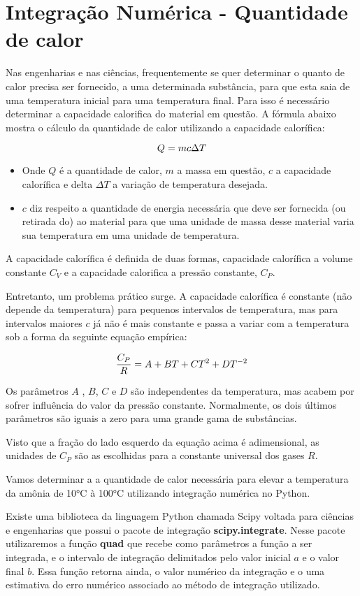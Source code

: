 \section{Integração Numérica - Quantidade de calor}

Nas engenharias e nas ciências, frequentemente se quer determinar o quanto de calor precisa ser fornecido, a uma determinada substância, para que esta saia de uma temperatura inicial para uma temperatura final. Para isso é necessário determinar a capacidade calorifica do material em questão. A fórmula abaixo mostra o cálculo da quantidade de calor utilizando a capacidade calorífica:

$$\Large Q = mc \Delta T$$

\begin{itemize}
\item Onde $Q$ é a quantidade de calor, $m$ a massa em questão,  $c$ a capacidade calorífica e delta $\Delta T$ a variação de temperatura desejada.
\item $c$ diz respeito a quantidade de energia necessária que deve ser fornecida (ou retirada do) ao material para que uma unidade de massa desse material varia sua temperatura em uma unidade de temperatura.
\end{itemize}

A capacidade calorífica é definida de duas formas, capacidade calorífica a volume constante $C_{V}$ e a capacidade calorifica a pressão constante, $C_{P}$.

Entretanto, um problema prático surge. A capacidade calorífica é constante (não depende da temperatura) para pequenos intervalos de temperatura, mas para intervalos maiores $c$ já não é mais constante e passa a variar com a temperatura sob a forma da seguinte equação empírica:

$$\Large \frac{C_{P}}{R} = A + BT + CT^2+DT^{-2}$$

Os parâmetros $A$ , $B$, $C$ e $D$ são independentes da temperatura, mas acabem por sofrer influência do valor da pressão constante. Normalmente, os dois últimos parâmetros são iguais a zero para uma grande gama de substâncias.

Visto que a fração do lado esquerdo da equação acima é adimensional, as unidades de  $C_{P}$ são as escolhidas para a constante universal dos gases $R$.

Vamos determinar a a quantidade de calor necessária para elevar a temperatura da amônia de 10°C à 100°C utilizando integração numérica no Python.

Existe uma biblioteca da linguagem Python chamada Scipy voltada para ciências e engenharias que possui o pacote de integração \textbf{scipy.integrate}. Nesse pacote utilizaremos a função \textbf{quad} que recebe como parâmetros a função a ser integrada, e o intervalo de integração delimitados pelo valor inicial $a$ e o valor final $b$. Essa função retorna ainda, o valor numérico da integração e o uma estimativa do erro numérico associado ao método de integração utilizado.

